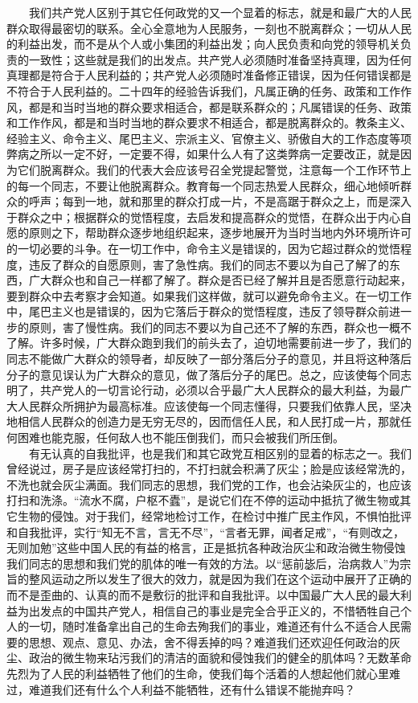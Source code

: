 \documentclass[cn,11pt,chinese]{elegantbook}
\begin{document}
　　我们共产党人区别于其它任何政党的又一个显着的标志，就是和最广大的人民群众取得最密切的联系。全心全意地为人民服务，一刻也不脱离群众；一切从人民的利益出发，而不是从个人或小集团的利益出发；向人民负责和向党的领导机关负责的一致性；这些就是我们的出发点。共产党人必须随时准备坚持真理，因为任何真理都是符合于人民利益的；共产党人必须随时准备修正错误，因为任何错误都是不符合于人民利益的。二十四年的经验告诉我们，凡属正确的任务、政策和工作作风，都是和当时当地的群众要求相适合，都是联系群众的；凡属错误的任务、政策和工作作风，都是和当时当地的群众要求不相适合，都是脱离群众的。教条主义、经验主义、命令主义、尾巴主义、宗派主义、官僚主义、骄傲自大的工作态度等项弊病之所以一定不好，一定要不得，如果什么人有了这类弊病一定要改正，就是因为它们脱离群众。我们的代表大会应该号召全党提起警觉，注意每一个工作环节上的每一个同志，不要让他脱离群众。教育每一个同志热爱人民群众，细心地倾听群众的呼声；每到一地，就和那里的群众打成一片，不是高踞于群众之上，而是深入于群众之中；根据群众的觉悟程度，去启发和提高群众的觉悟，在群众出于内心自愿的原则之下，帮助群众逐步地组织起来，逐步地展开为当时当地内外环境所许可的一切必要的斗争。在一切工作中，命令主义是错误的，因为它超过群众的觉悟程度，违反了群众的自愿原则，害了急性病。我们的同志不要以为自己了解了的东西，广大群众也和自己一样都了解了。群众是否已经了解并且是否愿意行动起来，要到群众中去考察才会知道。如果我们这样做，就可以避免命令主义。在一切工作中，尾巴主义也是错误的，因为它落后于群众的觉悟程度，违反了领导群众前进一步的原则，害了慢性病。我们的同志不要以为自己还不了解的东西，群众也一概不了解。许多时候，广大群众跑到我们的前头去了，迫切地需要前进一步了，我们的同志不能做广大群众的领导者，却反映了一部分落后分子的意见，并且将这种落后分子的意见误认为广大群众的意见，做了落后分子的尾巴。总之，应该使每个同志明了，共产党人的一切言论行动，必须以合乎最广大人民群众的最大利益，为最广大人民群众所拥护为最高标准。应该使每一个同志懂得，只要我们依靠人民，坚决地相信人民群众的创造力是无穷无尽的，因而信任人民，和人民打成一片，那就任何困难也能克服，任何敌人也不能压倒我们，而只会被我们所压倒。\\
　　有无认真的自我批评，也是我们和其它政党互相区别的显着的标志之一。我们曾经说过，房子是应该经常打扫的，不打扫就会积满了灰尘；脸是应该经常洗的，不洗也就会灰尘满面。我们同志的思想，我们党的工作，也会沾染灰尘的，也应该打扫和洗涤。“流水不腐，户枢不蠹”，是说它们在不停的运动中抵抗了微生物或其它生物的侵蚀。对于我们，经常地检讨工作，在检讨中推广民主作风，不惧怕批评和自我批评，实行“知无不言，言无不尽”，“言者无罪，闻者足戒”，“有则改之，无则加勉”这些中国人民的有益的格言，正是抵抗各种政治灰尘和政治微生物侵蚀我们同志的思想和我们党的肌体的唯一有效的方法。以“惩前毖后，治病救人”为宗旨的整风运动之所以发生了很大的效力，就是因为我们在这个运动中展开了正确的而不是歪曲的、认真的而不是敷衍的批评和自我批评。以中国最广大人民的最大利益为出发点的中国共产党人，相信自己的事业是完全合乎正义的，不惜牺牲自己个人的一切，随时准备拿出自己的生命去殉我们的事业，难道还有什么不适合人民需要的思想、观点、意见、办法，舍不得丢掉的吗？难道我们还欢迎任何政治的灰尘、政治的微生物来玷污我们的清洁的面貌和侵蚀我们的健全的肌体吗？无数革命先烈为了人民的利益牺牲了他们的生命，使我们每个活着的人想起他们就心里难过，难道我们还有什么个人利益不能牺牲，还有什么错误不能抛弃吗？\\
\end{document}
